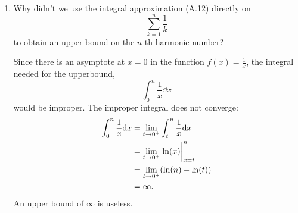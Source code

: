 \documentclass[AppendixA]{subfiles}
\begin{document}
\begin{enumerate}[leftmargin=\labelsep]
		\item Why didn't we use the integral approximation (A.12) directly on
		\[
			\sum_{k = 1}^n \frac{1}{k}
		\]
		to obtain an upper bound on the $n$-th harmonic number?
		\begin{answer}
			Since there is an asymptote at $x = 0$ in the function $f(x) = \frac{1}{x}$, the integral needed for the upperbound,
			\[
				\int_0^n \frac{1}{x} \dd x
			\]
			would be improper. The improper integral does not converge:
			\begin{align*}
				\int_0^n \frac{1}{x} \dd x &= \lim_{t \to 0^+} \int_t^n \frac{1}{x} \dd x\\
					&= \lim_{t \to 0^+} \eval{\ln(x)}_{x = t}^n\\
					&= \lim_{t \to 0^+} (\ln(n) - \ln(t))\\
					&= \infty.
			\end{align*}
			An upper bound of $\infty$ is useless.
		\end{answer}
		
	\end{enumerate}
\end{document}
